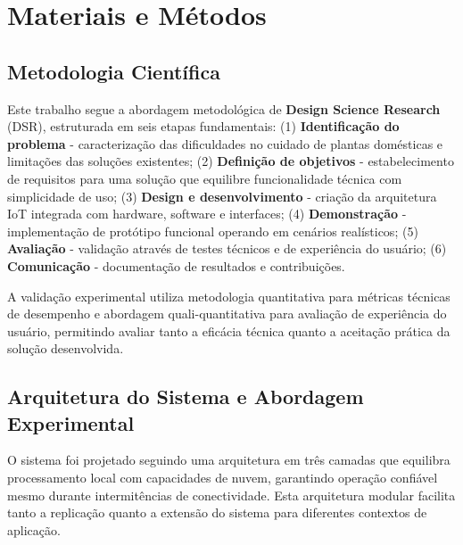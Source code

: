 \documentclass[twoside,english,brazilian]{UNISINOSmonografia}
\begin{document}
\chapter{Materiais e Métodos}

\section{Metodologia Científica}

Este trabalho segue a abordagem metodológica de \textbf{Design Science Research} (DSR), estruturada em seis etapas fundamentais: (1) \textbf{Identificação do problema} - caracterização das dificuldades no cuidado de plantas domésticas e limitações das soluções existentes; (2) \textbf{Definição de objetivos} - estabelecimento de requisitos para uma solução que equilibre funcionalidade técnica com simplicidade de uso; (3) \textbf{Design e desenvolvimento} - criação da arquitetura IoT integrada com hardware, software e interfaces; (4) \textbf{Demonstração} - implementação de protótipo funcional operando em cenários realísticos; (5) \textbf{Avaliação} - validação através de testes técnicos e de experiência do usuário; (6) \textbf{Comunicação} - documentação de resultados e contribuições.

A validação experimental utiliza metodologia quantitativa para métricas técnicas de desempenho e abordagem quali-quantitativa para avaliação de experiência do usuário, permitindo avaliar tanto a eficácia técnica quanto a aceitação prática da solução desenvolvida.



\section{Arquitetura do Sistema e Abordagem Experimental}

O sistema foi projetado seguindo uma arquitetura em três camadas que equilibra processamento local com capacidades de nuvem, garantindo operação confiável mesmo durante intermitências de conectividade. Esta arquitetura modular facilita tanto a replicação quanto a extensão do sistema para diferentes contextos de aplicação.
\end{document}
